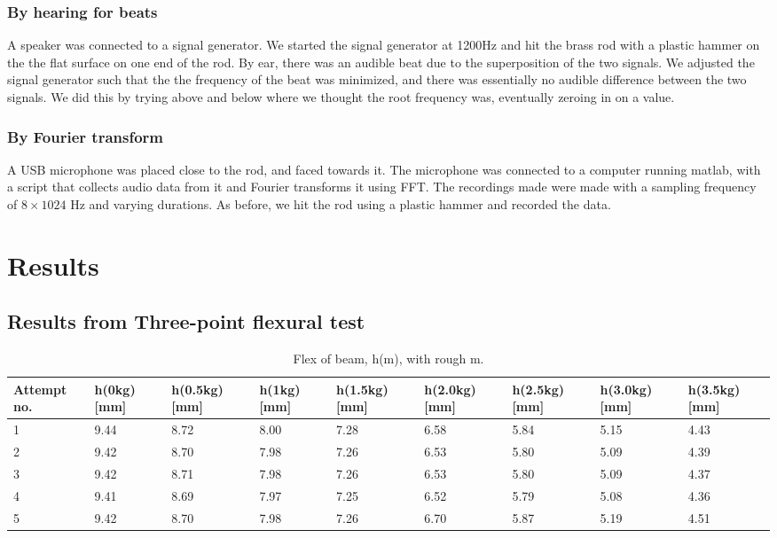 \documentclass[11pt,a4paper]{article}
\begin{document}
      \subsubsection{By hearing for beats}
        A speaker was connected to a signal generator. We started the signal generator at 1200Hz and hit the brass rod with a plastic hammer on the the flat surface on one end of the rod. By ear, there was an audible beat due to the superposition of the two signals. We adjusted the signal generator such that the the frequency of the beat was minimized, and there was essentially no audible difference between the two signals. We did this by trying above and below where we thought the root frequency was, eventually zeroing in on a value.

      \subsubsection{By Fourier transform}
        A USB microphone was placed close to the rod, and faced towards it. The microphone was connected to a computer running matlab, with a script that collects audio data from it and Fourier transforms it using FFT. The recordings made were made with a sampling frequency of $8\times1024$ Hz and varying durations. As before, we hit the rod using a plastic hammer and recorded the data.


\section{\label{sect:results}Results}
  \subsection{Results from Three-point flexural test}


    \begin{table}[H]
      \caption{Flex of beam, h(m), with rough m.}
      \center
      \begin{tabular}{ | p{1.2cm} | p{1.4cm} | p{1.4cm} | p{1.4cm} | p{1.4cm} | p{1.4cm} | p{1.4cm} | p{1.4cm} | p{1.4cm} |}
          \hline
          Attempt no. & h(0kg) [mm] & h(0.5kg) [mm] & h(1kg) [mm] & h(1.5kg) [mm] & h(2.0kg) [mm] & h(2.5kg) [mm] & h(3.0kg) [mm] & h(3.5kg) [mm] \\ 
          \hline
          1 & 9.44 & 8.72 & 8.00 & 7.28 & 6.58 & 5.84 & 5.15 & 4.43\\ \hline
          2 & 9.42 & 8.70 & 7.98 & 7.26 & 6.53 & 5.80 & 5.09 & 4.39\\ \hline
          3 & 9.42 & 8.71 & 7.98 & 7.26 & 6.53 & 5.80 & 5.09 & 4.37\\ \hline
          4 & 9.41 & 8.69 & 7.97 & 7.25 & 6.52 & 5.79 & 5.08 & 4.36\\ \hline
          5 & 9.42 & 8.70 & 7.98 & 7.26 & 6.70 & 5.87 & 5.19 & 4.51\\ \hline
      \end{tabular}
      \label{tab:flex}
    \end{table}
\end{document}
